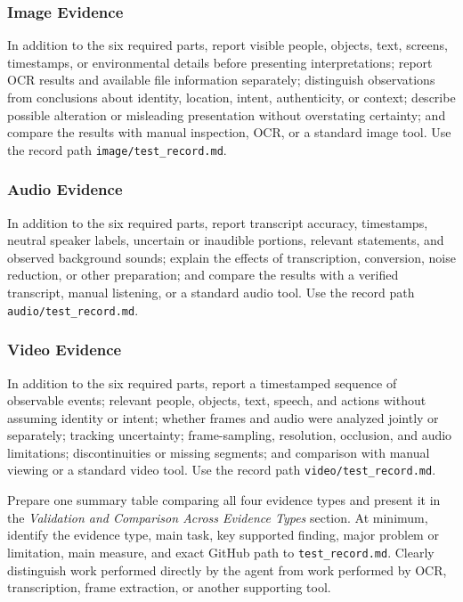 \documentclass[12pt,letterpaper]{article}
\begin{document}
\subsubsection{Image Evidence}
In addition to the six required parts, report visible people, objects, text, screens, timestamps, or environmental details before presenting interpretations; report OCR results and available file information separately; distinguish observations from conclusions about identity, location, intent, authenticity, or context; describe possible alteration or misleading presentation without overstating certainty; and compare the results with manual inspection, OCR, or a standard image tool. Use the record path \texttt{image/test\_record.md}.

\subsubsection{Audio Evidence}
In addition to the six required parts, report transcript accuracy, timestamps, neutral speaker labels, uncertain or inaudible portions, relevant statements, and observed background sounds; explain the effects of transcription, conversion, noise reduction, or other preparation; and compare the results with a verified transcript, manual listening, or a standard audio tool. Use the record path \texttt{audio/test\_record.md}.

\subsubsection{Video Evidence}
In addition to the six required parts, report a timestamped sequence of observable events; relevant people, objects, text, speech, and actions without assuming identity or intent; whether frames and audio were analyzed jointly or separately; tracking uncertainty; frame-sampling, resolution, occlusion, and audio limitations; discontinuities or missing segments; and comparison with manual viewing or a standard video tool. Use the record path \texttt{video/test\_record.md}.

Prepare one summary table comparing all four evidence types and present it in the \emph{Validation and Comparison Across Evidence Types} section. At minimum, identify the evidence type, main task, key supported finding, major problem or limitation, main measure, and exact GitHub path to \texttt{test\_record.md}. Clearly distinguish work performed directly by the agent from work performed by OCR, transcription, frame extraction, or another supporting tool.
\end{document}
